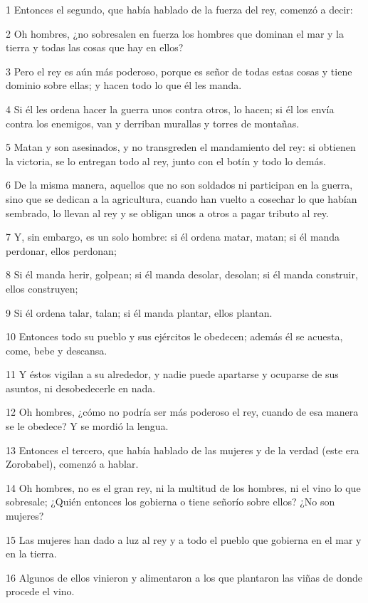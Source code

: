 \par 1 Entonces el segundo, que había hablado de la fuerza del rey, comenzó a decir:
\par 2 Oh hombres, ¿no sobresalen en fuerza los hombres que dominan el mar y la tierra y todas las cosas que hay en ellos?
\par 3 Pero el rey es aún más poderoso, porque es señor de todas estas cosas y tiene dominio sobre ellas; y hacen todo lo que él les manda.
\par 4 Si él les ordena hacer la guerra unos contra otros, lo hacen; si él los envía contra los enemigos, van y derriban murallas y torres de montañas.
\par 5 Matan y son asesinados, y no transgreden el mandamiento del rey: si obtienen la victoria, se lo entregan todo al rey, junto con el botín y todo lo demás.
\par 6 De la misma manera, aquellos que no son soldados ni participan en la guerra, sino que se dedican a la agricultura, cuando han vuelto a cosechar lo que habían sembrado, lo llevan al rey y se obligan unos a otros a pagar tributo al rey.
\par 7 Y, sin embargo, es un solo hombre: si él ordena matar, matan; si él manda perdonar, ellos perdonan;
\par 8 Si él manda herir, golpean; si él manda desolar, desolan; si él manda construir, ellos construyen;
\par 9 Si él ordena talar, talan; si él manda plantar, ellos plantan.
\par 10 Entonces todo su pueblo y sus ejércitos le obedecen; además él se acuesta, come, bebe y descansa.
\par 11 Y éstos vigilan a su alrededor, y nadie puede apartarse y ocuparse de sus asuntos, ni desobedecerle en nada.
\par 12 Oh hombres, ¿cómo no podría ser más poderoso el rey, cuando de esa manera se le obedece? Y se mordió la lengua.
\par 13 Entonces el tercero, que había hablado de las mujeres y de la verdad (este era Zorobabel), comenzó a hablar.
\par 14 Oh hombres, no es el gran rey, ni la multitud de los hombres, ni el vino lo que sobresale; ¿Quién entonces los gobierna o tiene señorío sobre ellos? ¿No son mujeres?
\par 15 Las mujeres han dado a luz al rey y a todo el pueblo que gobierna en el mar y en la tierra.
\par 16 Algunos de ellos vinieron y alimentaron a los que plantaron las viñas de donde procede el vino.
